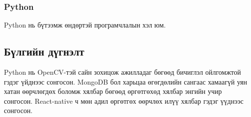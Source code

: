 	\subsubsection{Python}
	Python нь бүтээмж өндөртэй програмчлалын хэл юм.
	\subsection{Бүлгийн дүгнэлт}
	Python нь OpenCV-тэй сайн зохицож ажилладаг бөгөөд бичиглэл ойлгомжтой гэдэг үйднээс сонгосон. MongoDB бол харьцаа өгөгдөлийн сангаас хамаагүй уян хатан өөрчлөгдөх боломж хялбар бөгөөд өргөтгөхөд хялбар энгийн учир сонгосон. React-native ч мөн адил өргөтгөх өөрчлөх илүү хялбар гэдэг үүднээс сонгосон.
